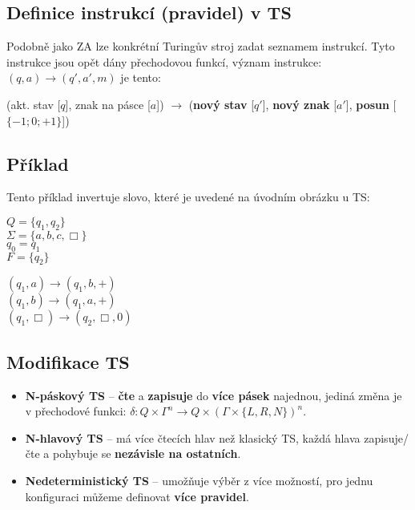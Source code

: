 \subsection{Definice instrukcí (pravidel) v TS}
Podobně jako ZA lze konkrétní Turingův stroj zadat seznamem instrukcí. Tyto instrukce jsou opět dány přechodovou
funkcí, význam instrukce: $(q, a) \rightarrow (q', a', m)$ je tento:
\begin{center}
    (akt. stav [$q$], znak na pásce [$a$]) $\rightarrow$ (\textbf{nový stav} [$q'$], \textbf{nový znak} [$a'$], \textbf{posun} [$\{-1;0;+1\}$])
\end{center}
\subsection{Příklad}
Tento příklad invertuje slovo, které je uvedené na úvodním obrázku u TS:
\begin{center}
    \begin{minipage}[t]{0.3\textwidth}
        $Q = \{q_1, q_2\}$\\
        $\Sigma = \{a, b, c, \Box\}$\\
        $q_0 = q_1$\\
        $F = \{q_2\}$\\
    \end{minipage}
    \begin{minipage}[t]{0.3\textwidth}
        $(q_1, a) \rightarrow (q_1, b, +)$\\
        $(q_1, b) \rightarrow (q_1, a, +)$\\
        $(q_1, \Box) \rightarrow (q_2, \Box, 0)$
    \end{minipage}
\end{center}

\subsection{Modifikace TS}
\begin{itemize}
    \item \textbf{N-páskový TS} -- \textbf{čte} a \textbf{zapisuje} do \textbf{více pásek} najednou, jediná změna je v přechodové funkci: $\delta :Q\times \Gamma ^{n}\rightarrow Q\times (\Gamma \times \{L,R,N\})^{n}$.
    \item \textbf{N-hlavový TS} -- má více čtecích hlav než klasický TS, každá hlava zapisuje/čte a pohybuje se \textbf{nezávisle na ostatních}.
    \item \textbf{Nedeterministický TS} -- umožňuje výběr z více možností, pro jednu konfiguraci můžeme definovat \textbf{více pravidel}.
\end{itemize}

